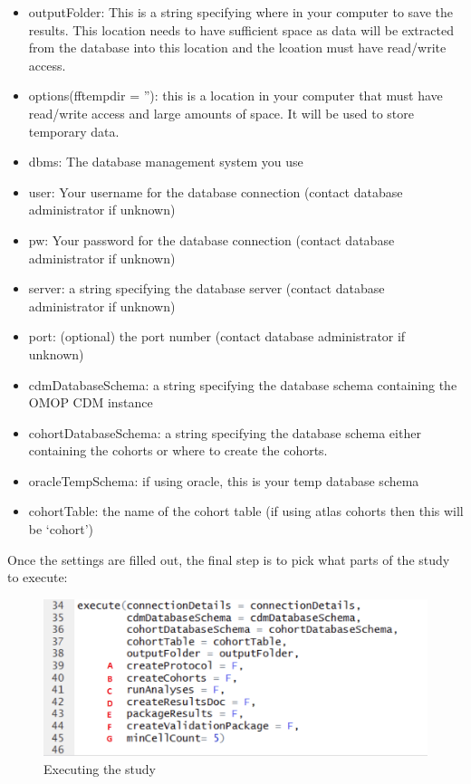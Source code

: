 \documentclass[11pt]{book}
\providecommand{\tightlist}{%
  \setlength{\itemsep}{0pt}\setlength{\parskip}{0pt}}
\begin{document}
\begin{itemize}
\tightlist
\item
  outputFolder: This is a string specifying where in your computer to
  save the results. This location needs to have sufficient space as data
  will be extracted from the database into this location and the
  lcoation must have read/write access.
\item
  options(fftempdir = ''): this is a location in your computer that must
  have read/write access and large amounts of space. It will be used to
  store temporary data.
\item
  dbms: The database management system you use
\item
  user: Your username for the database connection (contact database
  administrator if unknown)
\item
  pw: Your password for the database connection (contact database
  administrator if unknown)
\item
  server: a string specifying the database server (contact database
  administrator if unknown)
\item
  port: (optional) the port number (contact database administrator if
  unknown)
\item
  cdmDatabaseSchema: a string specifying the database schema containing
  the OMOP CDM instance
\item
  cohortDatabaseSchema: a string specifying the database schema either
  containing the cohorts or where to create the cohorts.
\item
  oracleTempSchema: if using oracle, this is your temp database schema
\item
  cohortTable: the name of the cohort table (if using atlas cohorts then
  this will be `cohort')
\end{itemize}

Once the settings are filled out, the final step is to pick what parts
of the study to execute:

\begin{figure}
\includegraphics[width=1\linewidth]{images/PatientLevelPrediction/atlasImplementation/execute} \caption{Executing the study}\label{fig:figureU20}
\end{figure}
\end{document}
